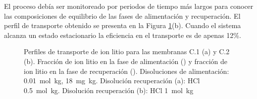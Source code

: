 El proceso debía ser monitoreado por periodos de tiempo más largos para conocer las composiciones de equilibrio de las fases de alimentación y recuperación. El perfil de transporte obtenido se presenta en la Figura \ref{fig:profileC1}(b). Cuando el sistema alcanza un estado estacionario la eficiencia en el transporte es de apenas 12\%.

\begin{figure}[H]
    \centering
    \caption[Primeros perfiles de transporte de ion litio en celda de permeación.]{Perfiles de transporte de ion litio para las membranas C.1 (a) y C.2 (b). Fracción de ion litio en la fase de alimentación (\protect\squareblck) y fracción de ion litio en la fase de recuperación (\protect\squarewht). Disoluciones de alimentación:  0.01~mol~kg\mnn,  18~mg~kg\mnn. Disolución recuperación (a): HCl 0.5~mol~kg\mnn. Disolución recuperación (b): HCl 1~mol~kg\mnn}        
    \label{fig:profileC1}
\end{figure}

